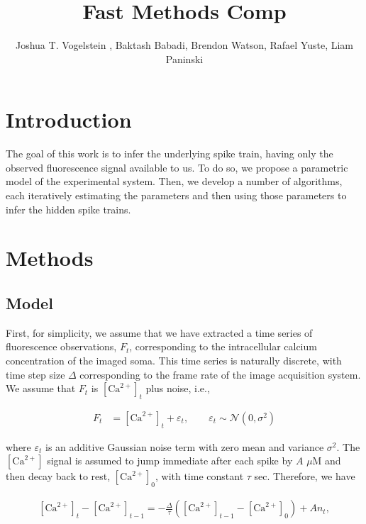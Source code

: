 \documentclass[12pt]{article}
\title{Fast Methods Comp}
\author{Joshua T. Vogelstein%
, Baktash Babadi, Brendon Watson, Rafael Yuste, Liam Paninski
}
\newcommand{\Ca}{[\text{Ca}^{2+}]}
\begin{document}
\maketitle %
\tableofcontents

\begin{abstract}

\end{abstract}

\section{Introduction}

The goal of this work is to infer the underlying spike train, having only the observed fluorescence signal available to us.  To do so, we propose a parametric model of the experimental system.  Then, we develop a number of algorithms, each iteratively estimating the parameters and then using those parameters to infer the hidden spike trains.  


\section{Methods}
\subsection{Model}

First, for simplicity, we assume that we have extracted a time series of fluorescence observations, $F_t$, corresponding to the intracellular calcium concentration of the imaged soma.  This time series is naturally discrete, with time step size $\Delta$ corresponding to the frame rate of the image acquisition system. We assume that $F_t$ is  $\Ca_t$ plus noise, i.e.,

\begin{align} \label{eq:F_t}
F_t &=  \Ca_t + \varepsilon_t, \qquad \varepsilon_t \sim \mathcal{N}(0,\sigma^2)
\end{align}

\noindent where $\varepsilon_t$ is an additive Gaussian noise term with zero mean and variance $\sigma^2$. The $\Ca$ signal is assumed to jump immediate after each spike by $A$ $\mu$M and then decay back to rest, $\Ca_0$, with time constant $\tau$ sec.  Therefore, we have

\begin{align} \label{eq:C_t}
\Ca_t - \Ca_{t-1}= - \frac{\Delta}{\tau} (\Ca_{t-1} - \Ca_0) + A n_t,
\end{align}
\end{document}
